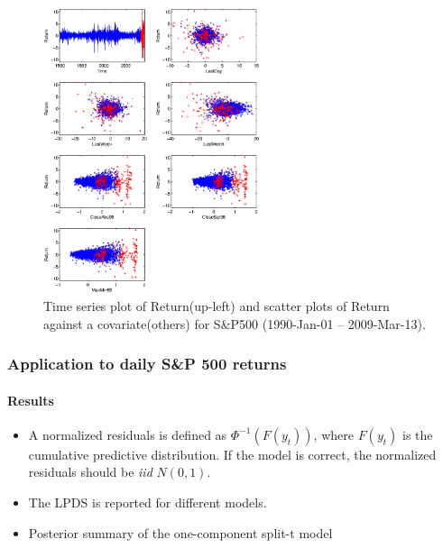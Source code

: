 \documentclass[10pt]{beamer}
\begin{document}
\begin{frame}[plain]
\begin{center}
\begin{figure}
    \includegraphics[height=8.4cm]{SP500Data.eps}
    \caption{\footnotesize{Time series plot of Return(up-left) and scatter plots of Return against a
        covariate(others) for S\&P500 (1990-Jan-01 -- 2009-Mar-13).}}\label{fg:sp500} 
  \end{figure}
\end{center}
\end{frame}

\begin{frame}
\frametitle{Application to daily S\&P 500 returns}
\framesubtitle{Results}
\begin{itemize}
\item A normalized residuals is defined as $\Phi^{-1}(F(y_t))$, where $F(y_t)$ is the
  cumulative predictive distribution. If the model is correct, the normalized residuals
  should be \emph{iid} $N(0,1).$  

\item The LPDS is reported for different models.
\item Posterior summary of the one-component split-t model 
\end{itemize}

\end{frame}
\end{document}
